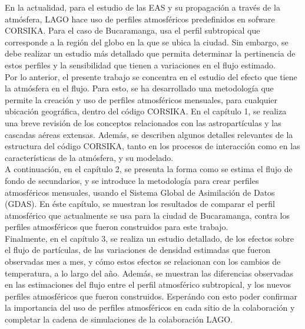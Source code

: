 En la actualidad, para el estudio de las EAS y su propagación a través de la atmósfera, LAGO hace uso de perfiles atmosféricos predefinidos en sofware CORSIKA. Para el caso de Bucaramanga, usa el perfil subtropical que corresponde a la región del globo en la que se ubica la ciudad. Sin embargo, se debe realizar un estudio más detallado que permita determinar la pertinencia de estos perfiles y la sensibilidad que tienen a variaciones en el flujo estimado.\\
%

Por lo anterior, el presente trabajo se concentra en el estudio del efecto que tiene la atmósfera en el flujo. Para esto, se ha desarrollado una metodología que permite la creación y uso de perfiles atmosféricos mensuales, para cualquier ubicación geográfica, dentro del código CORSIKA. En el capítulo 1, se realiza una breve revisión de los conceptos relacionados con las astropartículas y las cascadas aéreas extensas. Además, se describen algunos detalles relevantes de la estructura del código CORSIKA, tanto en los procesos de interacción como en las características de la atmósfera, y su modelado.\\

A continuación, en el capítulo 2, se presenta la forma como se estima el flujo de fondo de secundarios, y se introduce la metodología para crear perfiles atmosféricos mensuales, usando el Sistema Global de Asimilación de Datos (GDAS). En éste capítulo, se muestran los resultados de comparar el perfil atmosférico que actualmente se usa para la ciudad de Bucaramanga, contra los perfiles atmosféricos que fueron construidos para este trabajo.\\

Finalmente, en el capítulo 3, se realiza un estudio detallado, de los efectos sobre el flujo de partículas, de las variaciones de densidad estimadas que fueron observadas mes a mes, y cómo estos efectos se relacionan con los cambios de temperatura, a lo largo del año. Además, se muestran las diferencias observadas en las estimaciones del flujo entre el perfil atmosférico subtropical, y los nuevos perfiles atmosféricos que fueron construidos. Esperándo con esto poder confirmar la importancia del uso de perfiles atmosféricos en cada sitio de la colaboración y completar la cadena de simulaciones de la colaboración LAGO.\\
